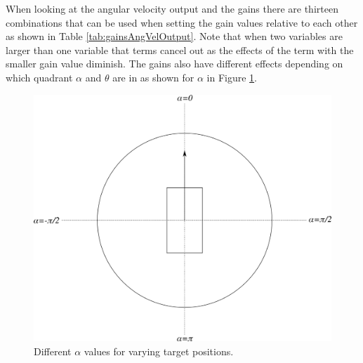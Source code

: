 \documentclass[12pt]{article}
\begin{document}
When looking at the angular velocity output and the gains there are thirteen combinations that can be used when setting the gain values relative to each other as shown in Table \ref{tab:gainsAngVelOutput}. Note that when two variables are larger than one variable that terms cancel out as the effects of the term with the smaller gain value diminish. The gains also have different effects depending on which quadrant $\alpha$ and $\theta$ are in as shown for $\alpha$ in Figure \ref{fig:robotAlpha}.

\begin{figure}[ht!]
	\centering
	\includegraphics[width=.3\textwidth]{images/robotAlpha}
	\caption{Different $\alpha$ values for varying target positions.}
	\label{fig:robotAlpha}
\end{figure}
\end{document}
